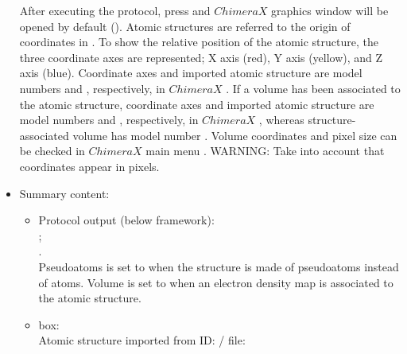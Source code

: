 \begin{itemize}
  After executing the protocol, press  and $ChimeraX$ graphics window will be opened by default (). 
  Atomic structures are referred to the origin of coordinates in \chimera. To show the relative position of the atomic structure, the three coordinate axes are represented; X axis (red), Y axis (yellow), and Z axis (blue). Coordinate axes and imported atomic structure are model numbers  and , respectively, in $ChimeraX$ . If a volume has been associated to the atomic structure, coordinate axes and imported atomic structure are model numbers  and , respectively, in $ChimeraX$ , whereas structure-associated volume has model number . Volume coordinates and pixel size can be checked in $ChimeraX$ main menu . WARNING: Take into account that coordinates appear in pixels.
   
   \item Summary content:
    \begin{itemize}
     \item Protocol output (below \scipion framework):\\ ;\\ .\\Pseudoatoms is set to  when the structure is made of pseudoatoms instead of atoms. Volume is set to  when an electron density map is associated to the atomic structure.
     \item {} box:\\Atomic structure imported from ID: / file: 
    \end{itemize}

  \end{itemize}
